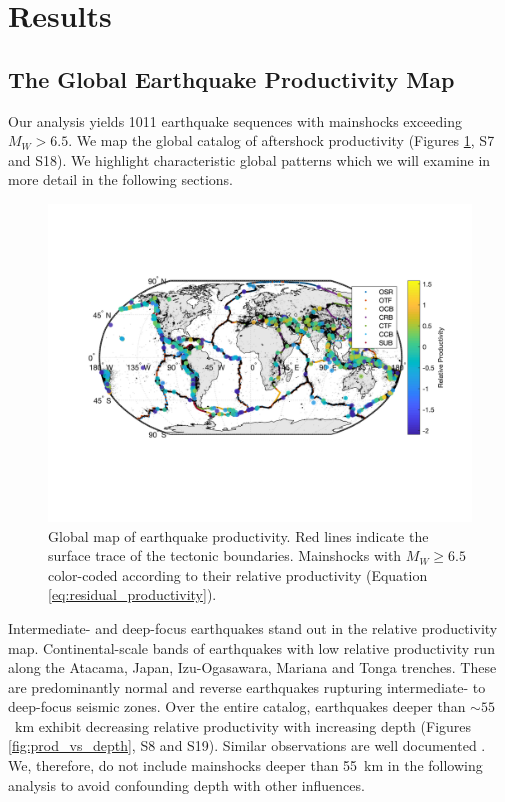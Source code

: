 \documentclass[draft, jgrga]{agujournal2018}
\begin{document}
\section{Results}
    \subsection{The Global Earthquake Productivity Map}\label{sec:glob}

    Our analysis yields 1011 earthquake sequences with mainshocks exceeding $M_W>6.5$. We map the global catalog of aftershock productivity (Figures \ref{fig:global_res}, S7 and S18). We highlight characteristic global patterns which we will examine in more detail in the following sections.

    \begin{figure}
    \includegraphics[width = \linewidth]{worldmap_res.png}
        \caption{Global map of earthquake productivity. Red lines indicate the surface trace of the tectonic boundaries. Mainshocks with $M_W\ge6.5$ color-coded according to their relative productivity (Equation \ref{eq:residual_productivity}).
        }
        \label{fig:global_res}
    \end{figure}

    Intermediate- and deep-focus earthquakes stand out in the relative productivity map. Continental-scale bands of earthquakes with low relative productivity run along the Atacama, Japan, Izu-Ogasawara, Mariana and Tonga trenches. These are predominantly normal and reverse earthquakes rupturing intermediate- to deep-focus seismic zones. Over the entire catalog, earthquakes deeper than $\sim55$~km exhibit decreasing relative productivity with increasing depth (Figures \ref{fig:prod_vs_depth}, S8 and S19). Similar observations are well documented \citep{Bath1965LateralMantle, Frohlich1989TheEarthquakes, Nyffenegger2000, Wiens1997AftershockZone, Wu1999, Houston2004}. We, therefore, do not include mainshocks deeper than 55~km  in the following analysis to avoid confounding depth with other influences.
\end{document}
